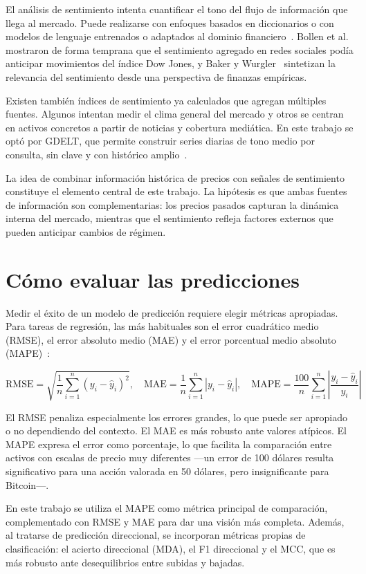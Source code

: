 El análisis de sentimiento intenta cuantificar el tono del flujo de información que llega al mercado. Puede realizarse con enfoques basados en diccionarios o con modelos de lenguaje entrenados o adaptados al dominio financiero~\cite{liu2020finbert}. Bollen et al.~\cite{bollen2011twitter} mostraron de forma temprana que el sentimiento agregado en redes sociales podía anticipar movimientos del índice Dow Jones, y Baker y Wurgler~\cite{baker2007investor} sintetizan la relevancia del sentimiento desde una perspectiva de finanzas empíricas.

Existen también índices de sentimiento ya calculados que agregan múltiples fuentes. Algunos intentan medir el clima general del mercado y otros se centran en activos concretos a partir de noticias y cobertura mediática. En este trabajo se optó por GDELT, que permite construir series diarias de tono medio por consulta, sin clave y con histórico amplio~\cite{gdelt2024api}.

La idea de combinar información histórica de precios con señales de sentimiento constituye el elemento central de este trabajo. La hipótesis es que ambas fuentes de información son complementarias: los precios pasados capturan la dinámica interna del mercado, mientras que el sentimiento refleja factores externos que pueden anticipar cambios de régimen.

\section{Cómo evaluar las predicciones}

Medir el éxito de un modelo de predicción requiere elegir métricas apropiadas. Para tareas de regresión, las más habituales son el error cuadrático medio (RMSE), el error absoluto medio (MAE) y el error porcentual medio absoluto (MAPE)~\cite{hyndman2006another}:

\[
\text{RMSE} = \sqrt{\frac{1}{n}\sum_{i=1}^{n}(y_i - \hat{y}_i)^2}, \quad
\text{MAE} = \frac{1}{n}\sum_{i=1}^{n}|y_i - \hat{y}_i|, \quad
\text{MAPE} = \frac{100}{n}\sum_{i=1}^{n}\left|\frac{y_i - \hat{y}_i}{y_i}\right|
\]

El RMSE penaliza especialmente los errores grandes, lo que puede ser apropiado o no dependiendo del contexto. El MAE es más robusto ante valores atípicos. El MAPE expresa el error como porcentaje, lo que facilita la comparación entre activos con escalas de precio muy diferentes ---un error de 100 dólares resulta significativo para una acción valorada en 50 dólares, pero insignificante para Bitcoin---.

En este trabajo se utiliza el MAPE como métrica principal de comparación, complementado con RMSE y MAE para dar una visión más completa. Además, al tratarse de predicción direccional, se incorporan métricas propias de clasificación: el acierto direccional (MDA), el F1 direccional y el MCC, que es más robusto ante desequilibrios entre subidas y bajadas.
